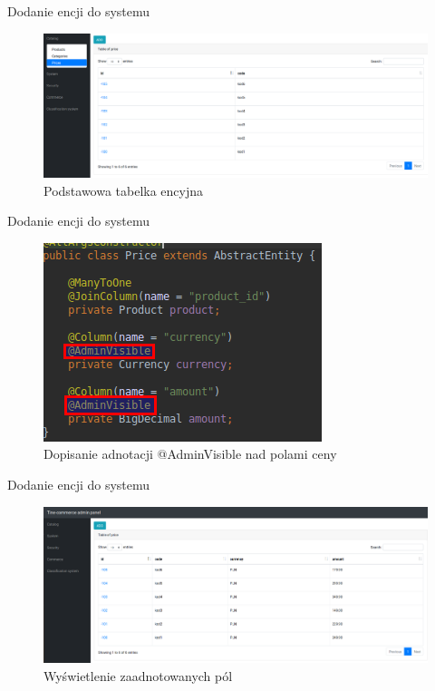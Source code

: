\documentclass[polish,xcolor=table,9pt,aspectratio=1610,hyperref={pdfpagemode=FullScreen}]{beamer}
\begin{document}
\begin{frame}{Dodanie encji do systemu}
\begin{figure}
	\begin{center}
		\includegraphics[scale=0.2]{4.png}
	\end{center}
	\caption{{\color{black}Podstawowa tabelka encyjna}} 
\end{figure}
\end{frame}

\begin{frame}{Dodanie encji do systemu}
\begin{figure}
	\begin{center}
		\includegraphics[scale=0.6]{5.png}
\end{center}
\caption{{\color{black}Dopisanie adnotacji @AdminVisible nad polami ceny}} 
\end{figure}
\end{frame}

\begin{frame}{Dodanie encji do systemu}
\begin{figure}
	\begin{center}
		\includegraphics[scale=0.2]{6.png}
\end{center}
\caption{{\color{black}Wyświetlenie zaadnotowanych pól}} 
\end{figure}
\end{frame}
\end{document}
